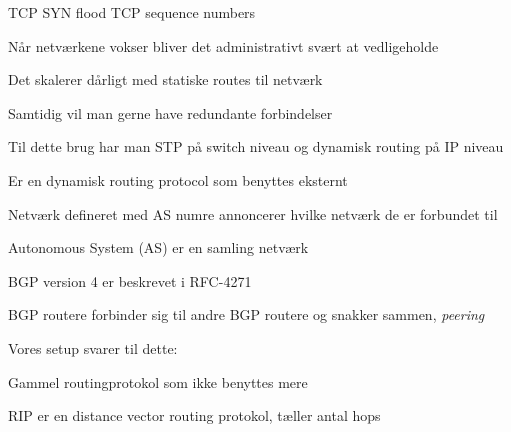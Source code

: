 \documentclass[Screen16to9,17pt]{foils}
\begin{document}
TCP SYN flood
TCP sequence numbers




\begin{list1}
\item Når netværkene vokser bliver det administrativt svært at vedligeholde
\item Det skalerer dårligt med statiske routes til netværk
\item Samtidig vil man gerne have redundante forbindelser
\item Til dette brug har man STP på switch niveau og dynamisk routing på IP niveau
\end{list1}





\begin{list1}
\item Er en dynamisk routing protocol som benyttes eksternt
\item Netværk defineret med AS numre annoncerer hvilke netværk de er forbundet til
\item Autonomous System (AS) er en samling netværk
\item BGP version 4 er beskrevet i RFC-4271
\item BGP routere forbinder sig til andre BGP routere og snakker sammen, \emph{peering}
\item {}
\item Vores setup svarer til dette:
\item {}
\end{list1}


\begin{list1}
\item Gammel routingprotokol som ikke benyttes mere
\item RIP er en distance vector routing protokol, tæller antal hops
\item {}
\end{list1}



\end{document}
